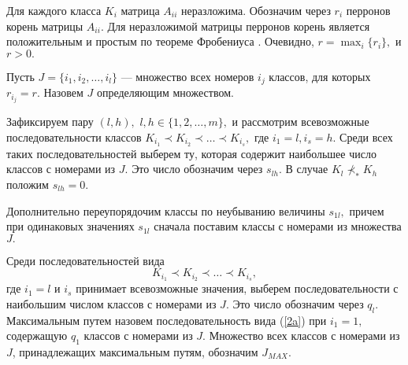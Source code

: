 \documentclass[%
11pt,a4paper]{article}
\begin{document}
{Для каждого класса $K_i$ матрица $A_{ii}$ неразложима.
Обозначим через $r_i$ перронов корень матрицы $A_{ii}.$ Для неразложимой матрицы перронов корень является положительным и простым по теореме Фробениуса \cite{gant}.  Очевидно, $r=\max_{i} \{r_i\},$ и $r>0.$

Пусть $J=\{i_1,i_2, \ldots , i_l\}$ --- множество всех номеров $i_j$ классов, для которых $r_{i_j}=r.$
Назовем $J$ определяющим множеством.

Зафиксируем пару $(l, h), $ $l,h \in \{1,2,\ldots,m\},$ и рассмотрим всевозможные последовательности классов $K_{i_1} \prec K_{i_2} \prec \ldots \prec K_{i_s},$ где $i_1=l, i_s=h.$ Среди всех таких последовательностей выберем ту, которая содержит наибольшее число классов с номерами из $J$. Это число обозначим через $s_{l h}.$ В случае $K_l \nprec_* K_h$ положим $s_{l h}=0.$



Дополнительно переупорядочим классы по неубыванию величины $s_{1l},$ причем при одинаковых значениях $s_{1l}$ сначала поставим классы с номерами из множества $J.$



Среди последовательностей вида
\begin{equation}
K_{i_1} \prec K_{i_2} \prec \ldots \prec K_{i_s},
\label{2a}
\end{equation}
где $i_1=l$ и $i_s$ принимает всевозможные значения, выберем последовательности с наибольшим числом классов с номерами из $J$. Это число обозначим через $q_l.$
Максимальным путем назовем последовательность вида (\ref{2a}) при $i_1=1,$ содержащую $q_1$ классов с номерами из $J.$
Множество всех классов с номерами из $J$, принадлежащих максимальным путям, обозначим $J_{MAX}.$

}
\end{document}
